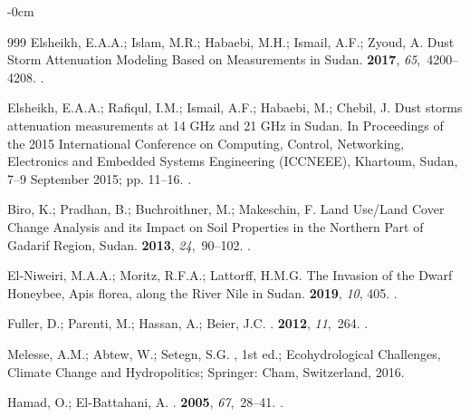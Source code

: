 \documentclass[jimaging,article,accept,pdftex,moreauthors]{Definitions/mdpi}
\begin{document}
\begin{adjustwidth}{-\extralength}{0cm}
\begin{thebibliography}{999}
Elsheikh, E.A.A.; Islam, M.R.; Habaebi, M.H.; Ismail, A.F.; Zyoud, A.
\newblock Dust Storm Attenuation Modeling Based on Measurements in Sudan.
 {\bf 2017}, {\em
  65},~4200--4208.
.

Elsheikh, E.A.A.; Rafiqul, I.M.; Ismail, A.F.; Habaebi, M.; Chebil, J.
\newblock Dust storms attenuation measurements at 14 GHz and 21 GHz in Sudan.
\newblock In Proceedings of the 2015 International Conference on Computing,
  Control, Networking, Electronics and Embedded Systems Engineering (ICCNEEE), Khartoum, Sudan, 7--9 September 2015; pp. 11--16.
.

Biro, K.; Pradhan, B.; Buchroithner, M.; Makeschin, F.
\newblock Land Use/Land Cover Change Analysis and its Impact on Soil Properties
  in the Northern Part of Gadarif Region, Sudan.
 {\bf 2013}, {\em 24},~90--102.
.

El-Niweiri, M.A.A.; Moritz, R.F.A.; Lattorff, H.M.G.
\newblock The Invasion of the Dwarf Honeybee, Apis florea, along the River Nile
  in Sudan.
 {\bf 2019}, {\em 10}, 405.
.

Fuller, D.; Parenti, M.; Hassan, A.; Beier, J.C.
.
 {\bf 2012}, {\em 11},~264.
.

Melesse, A.M.; Abtew, W.; Setegn, S.G.
, 1st ed.; Ecohydrological Challenges, Climate Change and Hydropolitics; Springer: Cham, Switzerland,  2016.

Hamad, O.; El-Battahani, A.
.
 {\bf 2005}, {\em 67},~28--41.
.


\end{thebibliography}
\end{adjustwidth}
\end{document}
